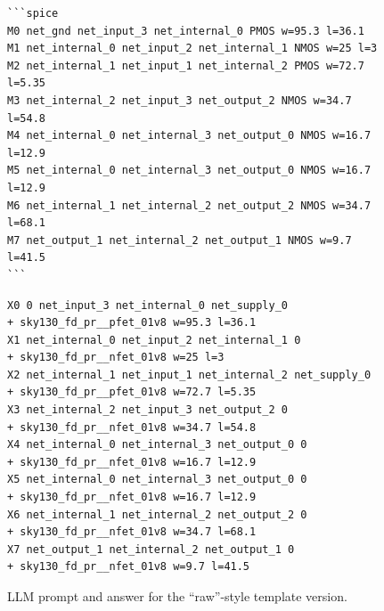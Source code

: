 \documentclass[sigconf,pbalance]{acmart_modified}
\begin{document}
\begin{figure}
\begin{minipage}[t]{0.44\textwidth}
\begin{prompt}
\begin{Verbatim}[breaklines=true,breaksymbolleft={},commandchars=\\\{\}]
```spice
M0 net_gnd net_input_3 net_internal_0 PMOS w=95.3 l=36.1
M1 net_internal_0 net_input_2 net_internal_1 NMOS w=25 l=3
M2 net_internal_1 net_input_1 net_internal_2 PMOS w=72.7 l=5.35
M3 net_internal_2 net_input_3 net_output_2 NMOS w=34.7 l=54.8
M4 net_internal_0 net_internal_3 net_output_0 NMOS w=16.7 l=12.9
M5 net_internal_0 net_internal_3 net_output_0 NMOS w=16.7 l=12.9
M6 net_internal_1 net_internal_2 net_output_2 NMOS w=34.7 l=68.1
M7 net_output_1 net_internal_2 net_output_1 NMOS w=9.7 l=41.5
```
\end{Verbatim}
\end{prompt}

\begin{prompt}[Extracted Netlist (Skywater-PDK): Reward = 0.720]
    \fontsize{6pt}{6pt}\selectfont
    \ttfamily
    \begin{Verbatim}[breaklines=true,breaksymbolleft={}]
X0 0 net_input_3 net_internal_0 net_supply_0
+ sky130_fd_pr__pfet_01v8 w=95.3 l=36.1
X1 net_internal_0 net_input_2 net_internal_1 0
+ sky130_fd_pr__nfet_01v8 w=25 l=3
X2 net_internal_1 net_input_1 net_internal_2 net_supply_0
+ sky130_fd_pr__pfet_01v8 w=72.7 l=5.35
X3 net_internal_2 net_input_3 net_output_2 0
+ sky130_fd_pr__nfet_01v8 w=34.7 l=54.8
X4 net_internal_0 net_internal_3 net_output_0 0
+ sky130_fd_pr__nfet_01v8 w=16.7 l=12.9
X5 net_internal_0 net_internal_3 net_output_0 0
+ sky130_fd_pr__nfet_01v8 w=16.7 l=12.9
X6 net_internal_1 net_internal_2 net_output_2 0
+ sky130_fd_pr__nfet_01v8 w=34.7 l=68.1
X7 net_output_1 net_internal_2 net_output_1 0
+ sky130_fd_pr__nfet_01v8 w=9.7 l=41.5
\end{Verbatim}
\end{prompt}
\end{minipage}
\caption{LLM prompt and answer for the ``raw''-style template version.}
\label{fig:full_style_template}
\end{figure}
\end{document}
